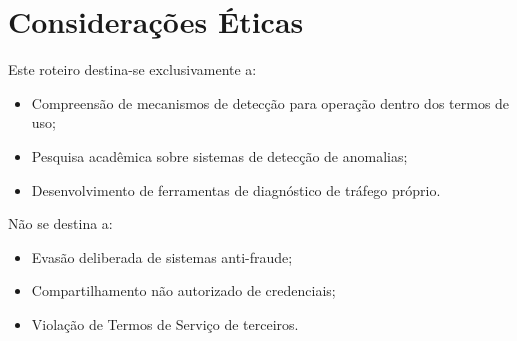 \documentclass[12pt,openright,oneside,a4paper]{abntex2}
\begin{document}
\chapter{Considerações Éticas}

Este roteiro destina-se exclusivamente a:
\begin{itemize}
    \item Compreensão de mecanismos de detecção para operação dentro dos termos de uso;
    \item Pesquisa acadêmica sobre sistemas de detecção de anomalias;
    \item Desenvolvimento de ferramentas de diagnóstico de tráfego próprio.
\end{itemize}

Não se destina a:
\begin{itemize}
    \item Evasão deliberada de sistemas anti-fraude;
    \item Compartilhamento não autorizado de credenciais;
    \item Violação de Termos de Serviço de terceiros.
\end{itemize}


\end{document}
